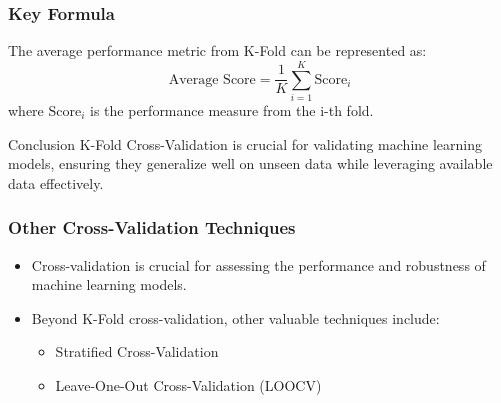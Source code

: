 \documentclass[aspectratio=169]{beamer}
\begin{document}
\begin{frame}[fragile]
    \frametitle{Key Formula}
    The average performance metric from K-Fold can be represented as:
    \begin{equation}
        \text{Average Score} = \frac{1}{K} \sum_{i=1}^{K} \text{Score}_i
    \end{equation}
    where $\text{Score}_i$ is the performance measure from the i-th fold.
    
    \begin{block}{Conclusion}
        K-Fold Cross-Validation is crucial for validating machine learning models, ensuring they generalize well on unseen data while leveraging available data effectively.
    \end{block}
\end{frame}

\begin{frame}[fragile]
    \frametitle{Other Cross-Validation Techniques}
    \begin{itemize}
        \item Cross-validation is crucial for assessing the performance and robustness of machine learning models.
        \item Beyond K-Fold cross-validation, other valuable techniques include:
        \begin{itemize}
            \item Stratified Cross-Validation
            \item Leave-One-Out Cross-Validation (LOOCV)
        \end{itemize}
    \end{itemize}
\end{frame}
\end{document}
